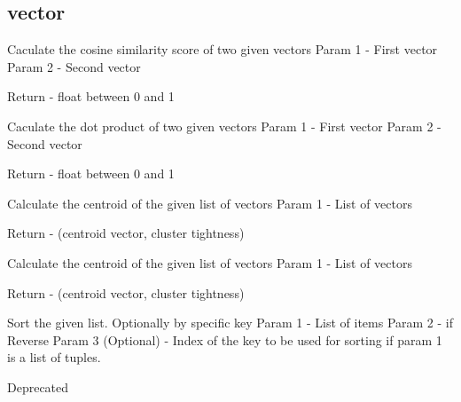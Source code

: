 \subsection{vector}
{Caculate the cosine similarity score of two given vectors
Param 1 - First vector
Param 2 - Second vector

Return - float between 0 and 1}
{Caculate the dot product of two given vectors
Param 1 - First vector
Param 2 - Second vector

Return - float between 0 and 1}
{Calculate the centroid of the given list of vectors
Param 1 - List of vectors

Return - (centroid vector, cluster tightness)}
{Calculate the centroid of the given list of vectors
Param 1 - List of vectors

Return - (centroid vector, cluster tightness)}
{Sort the given list. Optionally by specific key
Param 1 - List of items
Param 2 - if Reverse
Param 3 (Optional) - Index of the key to be used for sorting
if param 1 is a list of tuples.

Deprecated}
